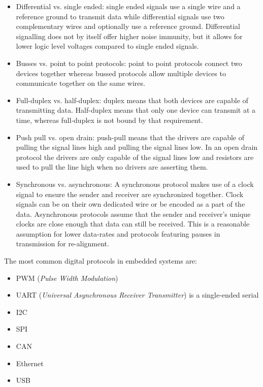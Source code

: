 \documentclass[main.tex]{subfiles}
\begin{document}
\begin{itemize}
    \item Differential vs. single ended: single ended signals use a single wire and a reference ground to transmit data while differential signals use two complementary wires and optionally use a reference ground. Differential signalling does not by itself offer higher noise immunity, but it allows for lower logic level voltages compared to single ended signals. 
    \item Busses vs. point to point protocols: point to point protocols connect two devices together whereas bussed protocols allow multiple devices to communicate together on the same wires. 
    \item Full-duplex vs. half-duplex: duplex means that both devices are capable of transmitting data. Half-duplex means that only one device can transmit at a time, whereas full-duplex is not bound by that requirement. 
    \item Push pull vs. open drain: push-pull means that the drivers are capable of pulling the signal lines high and pulling the signal lines low. In an  open drain protocol the drivers are only capable of the signal lines low and resistors are used to pull the line high when no drivers are asserting them.
    \item Synchronous vs. asynchronous: A synchronous protocol makes use of a clock signal to ensure the sender and receiver are synchronized together. Clock signals can be on their own dedicated wire or be encoded as a part of the data. Asynchronous protocols assume that the sender and receiver's unique clocks are close enough that data can still be received. This is a reasonable assumption for lower data-rates and protocols featuring pauses in transmission for re-alignment.
\end{itemize}

The most common digital protocols in embedded systems are:
\begin{itemize} %
    \item PWM (\textit{Pulse Width Modulation})
    \item UART (\textit{Universal Asynchronous Receiver Transmitter}) is a single-ended serial
    \item I2C 
    \item SPI
    \item CAN
    \item Ethernet
    \item USB
\end{itemize}
\end{document}
